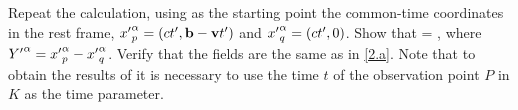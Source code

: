 \newcommand{\xpap}{{x'}^\alp_p}
\newcommand{\xpaq}{{x'}^\alp_q}
\newcommand{\Ya}{Y^\alp}
\newcommand{\Ysa}{Y_\alp}
\newcommand{\Yb}{Y^\bet}
\newcommand{\Ypa}{{Y'}^\alp}

\begin{problem}
	Repeat the calculation, using as the starting point the common-time coordinates in the rest frame, ${\xpap = (ct', \vbb - \vv t')}$ and $\xpaq = (ct', 0)$.  Show that
	\beqn \label{show2.b}
		\Fab =  \frac{\Ya \Ub - \Yb \Ua}{(- \Ysa \Ya)^{3/2}},
	\eeqn
	where $\Ypa = \xpap - \xpaq$.  Verify that the fields are the same as in \ref{2.a}.  Note that to obtain the results of  it is necessary to use the time $t$ of the observation point $P$ in $K$ as the time parameter.
\end{problem}

\newcommand{\Ypsa}{{Y'}_\alp}
\newcommand{\Ypb}{{Y'}^\bet}
\newcommand{\Upa}{{U'}^\alp}
\newcommand{\Upb}{{U'}^\bet}
\newcommand{\vo}{\mathbf{0}}
\newcommand{\tp}{{t'}}

